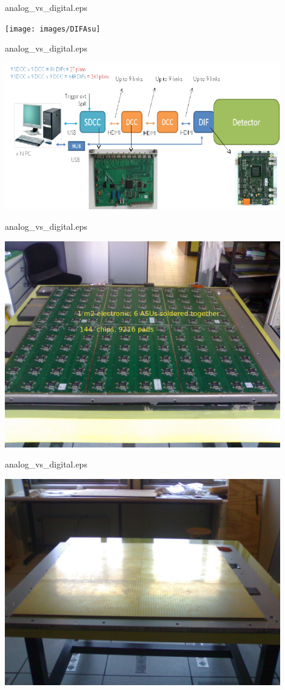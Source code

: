 \begin{frame}{analog\_vs\_digital.eps}
  \centerline{\texttt{[image: images/DIFAsu]}}
\end{frame}
\begin{frame}{analog\_vs\_digital.eps}
  \centerline{\includegraphics[width=0.9\textwidth]{images/DAQLinks}}
\end{frame}
\begin{frame}{analog\_vs\_digital.eps}
  \centerline{\includegraphics[width=0.9\textwidth]{images/1m2HR2}}
\end{frame}
\begin{frame}{analog\_vs\_digital.eps}
  \centerline{\includegraphics[width=0.9\textwidth]{images/1m2Pad}}
\end{frame}
